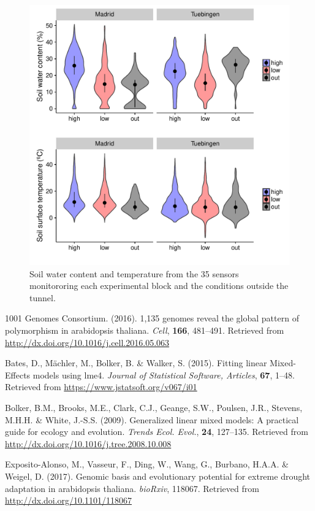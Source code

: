\documentclass[12pt,]{article}
\begin{document}
\begin{figure}
    \centerline{\includegraphics[width=5in]{../figs/Figure_watering_temperature.pdf}}
    \caption{ Soil water content and temperature from the 35 sensors monitororing each experimental block and the conditions outside the tunnel.}
    \label{fig:histoenv}
\end{figure}

\hypertarget{refs}{}
\hypertarget{ref-1001_Genomes_Consortium2016-nw}{}
1001 Genomes Consortium. (2016). 1,135 genomes reveal the global pattern
of polymorphism in arabidopsis thaliana. \emph{Cell}, \textbf{166},
481--491. Retrieved from
\url{http://dx.doi.org/10.1016/j.cell.2016.05.063}

\hypertarget{ref-Bates2015-ly}{}
Bates, D., Mächler, M., Bolker, B. \& Walker, S. (2015). Fitting linear
Mixed-Effects models using lme4. \emph{Journal of Statistical Software,
Articles}, \textbf{67}, 1--48. Retrieved from
\url{https://www.jstatsoft.org/v067/i01}

\hypertarget{ref-Bolker2009-by}{}
Bolker, B.M., Brooks, M.E., Clark, C.J., Geange, S.W., Poulsen, J.R.,
Stevens, M.H.H. \& White, J.-S.S. (2009). Generalized linear mixed
models: A practical guide for ecology and evolution. \emph{Trends Ecol.
Evol.}, \textbf{24}, 127--135. Retrieved from
\url{http://dx.doi.org/10.1016/j.tree.2008.10.008}

\hypertarget{ref-Exposito-Alonso2017-ob}{}
Exposito-Alonso, M., Vasseur, F., Ding, W., Wang, G., Burbano, H.A.A. \&
Weigel, D. (2017). Genomic basis and evolutionary potential for extreme
drought adaptation in arabidopsis thaliana. \emph{bioRxiv}, 118067.
Retrieved from \url{http://dx.doi.org/10.1101/118067}
\end{document}
